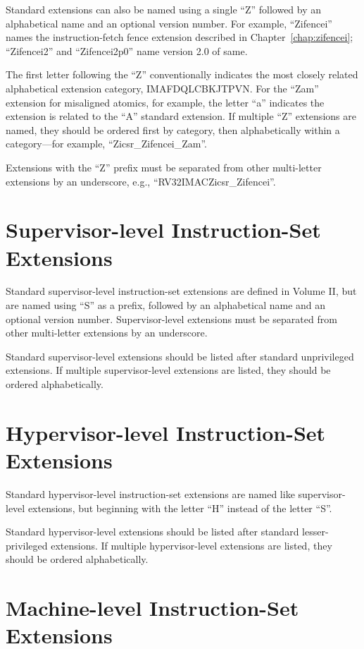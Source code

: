 Standard extensions can also be named using a single ``Z'' followed by an
alphabetical name and an optional version number.  For example,
``Zifencei'' names the instruction-fetch fence extension described in
Chapter~\ref{chap:zifencei}; ``Zifencei2'' and ``Zifencei2p0'' name version
2.0 of same.

The first letter following the ``Z'' conventionally indicates the most closely
related alphabetical extension category, IMAFDQLCBKJTPVN.  For the ``Zam''
extension for misaligned atomics, for example, the letter ``a'' indicates the
extension is related to the ``A'' standard extension.  If multiple ``Z''
extensions are named, they should be ordered first by category, then
alphabetically within a category---for example, ``Zicsr\_Zifencei\_Zam''.

Extensions with the ``Z'' prefix must be separated
from other multi-letter extensions by an underscore, e.g.,
``RV32IMACZicsr\_Zifencei''.

\section{Supervisor-level Instruction-Set Extensions}

Standard supervisor-level instruction-set extensions are defined in Volume II,
but are named using ``S'' as a prefix, followed by an alphabetical name and an
optional version number.  Supervisor-level extensions must be separated from
other multi-letter extensions by an underscore.

Standard supervisor-level extensions should be listed after standard
unprivileged extensions.  If multiple supervisor-level extensions are listed,
they should be ordered alphabetically.

\section{Hypervisor-level Instruction-Set Extensions}

Standard hypervisor-level instruction-set extensions are named like
supervisor-level extensions, but beginning with the letter ``H'' instead of
the letter ``S''.

Standard hypervisor-level extensions should be listed after standard
lesser-privileged extensions.  If multiple hypervisor-level extensions are
listed, they should be ordered alphabetically.

\section{Machine-level Instruction-Set Extensions}

